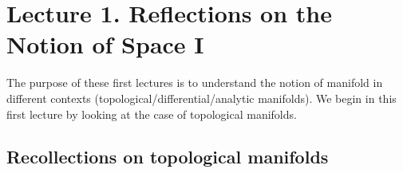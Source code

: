 \setcounter{chapter}{0}
\chapter{Lecture 1. Reflections on the Notion of Space I}

The purpose of these first lectures is to understand the notion of manifold in different contexts (topological/differential/analytic manifolds). We begin in this first lecture by looking at the case of topological manifolds.

\section{Recollections on topological manifolds}


\begin{defn}

\end{defn}